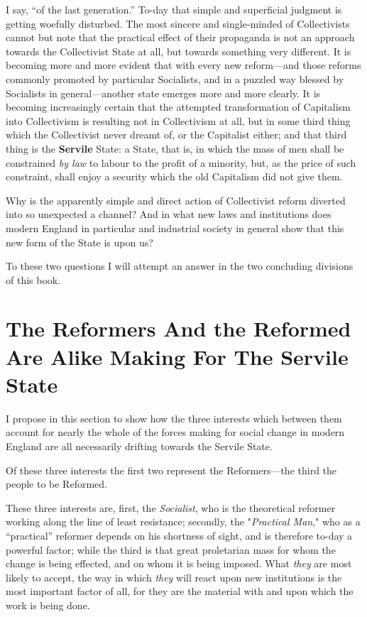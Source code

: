 \documentclass{book}
\begin{document}
I say, “of the last generation.” To-day that simple and superficial judgment is getting woefully disturbed. The most sincere and single-minded of Collectivists cannot but note that the practical effect of their propaganda is not an approach towards the Collectivist State at all, but towards something very different. It is becoming more and more evident that with every new reform—and those reforms commonly promoted by particular Socialists, and in a puzzled way blessed by Socialists in general—another state emerges more and more clearly. It is becoming increasingly certain that the attempted transformation of Capitalism into Collectivism is resulting not in Collectivism at all, but in some third thing which the Collectivist never dreamt of, or the Capitalist either; and that third thing is the \textbf{Servile} State: a State, that is, in which the mass of men shall be constrained \emph{by law} to labour to the profit of a minority, but, as the price of such constraint, shall enjoy a security which the old Capitalism did not give them.

Why is the apparently simple and direct action of Collectivist reform diverted into so unexpected a channel? And in what new laws and institutions does modern England in particular and industrial society in general show that this new form of the State is upon us?

To these two questions I will attempt an answer in the two concluding divisions of this book.

\chapter{The Reformers And the Reformed Are Alike Making For The Servile State}
\label{chapter-8}
I propose in this section to show how the three interests which between them account for nearly the whole of the forces making for social change in modern England are all necessarily drifting towards the Servile State.

Of these three interests the first two represent the Reformers—the third the people to be Reformed.

These three interests are, first, the \emph{Socialist}, who is the theoretical reformer working along the line of least resistance; secondly, the "\emph{Practical Man}," who as a “practical” reformer depends on his shortness of sight, and is therefore to-day a powerful factor; while the third is that great proletarian mass for whom the change is being effected, and on whom it is being imposed. What \emph{they} are most likely to accept, the way in which \emph{they} will react upon new institutions is the most important factor of all, for they are the material with and upon which the work is being done.
\end{document}
